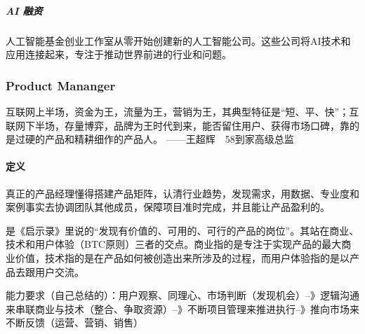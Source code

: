 \documentclass[letterpaper,11pt,english]{sphinxmanual}
\begin{document}
\subparagraph{AI 融资}
\label{\detokenize{chapter_introduction/money:id27}}
人工智能基金创业工作室从零开始创建新的人工智能公司。这些公司将AI技术和应用连接起来，专注于推动世界前进的行业和问题。


\subsubsection{Product Mananger}
\label{\detokenize{chapter_introduction/PM:product-mananger}}\label{\detokenize{chapter_introduction/PM::doc}}
互联网上半场，资金为王，流量为王，营销为王，其典型特征是“短、平、快”；互联网下半场，存量博弈，品牌为王时代到来，能否留住用户、获得市场口碑，靠的是过硬的产品和精耕细作的产品人。
——王超辉　58到家高级总监
%
\begin{footnote}[122]\sphinxAtStartFootnote
{}
%
\end{footnote}


\paragraph{定义}
\label{\detokenize{chapter_introduction/PM:id1}}
真正的产品经理懂得搭建产品矩阵，认清行业趋势，发现需求，用数据、专业度和案例事实去协调团队其他成员，保障项目准时完成，并且能让产品盈利的。
%
\begin{footnote}[123]\sphinxAtStartFootnote
{}
%
\end{footnote}是《启示录》里说的“发现有价值的、可用的、可行的产品的岗位”。其站在商业、技术和用户体验（BTC原则）三者的交点。商业指的是专注于实现产品的最大商业价值，技术指的是在产品如何被创造出来所涉及的过程，而用户体验指的是以产品去跟用户交流。%
\begin{footnote}[124]\sphinxAtStartFootnote
{}
%
\end{footnote}

能力要求（自己总结的）：用户观察、同理心、市场判断（发现机会）–》逻辑沟通来串联商业与技术（整合、争取资源）–》不断项目管理来推进执行–》推向市场来不断反馈（运营、营销、销售）
\end{document}
